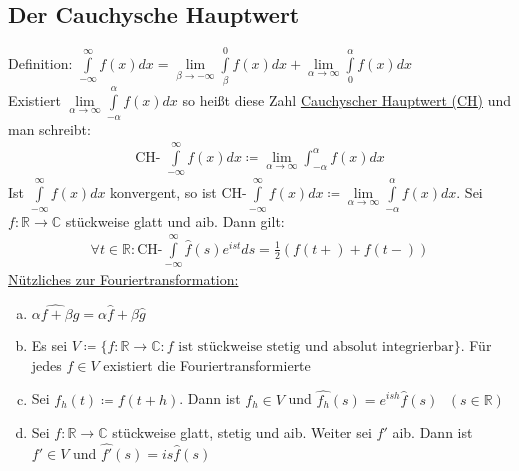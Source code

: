 \subsection{Der Cauchysche Hauptwert}
Definition: $ \int \limits_{-\infty}^\infty f(x) dx= \lim \limits_{\beta \to - \infty} \int \limits_\beta^0 f(x) dx + \lim \limits_{\alpha \to \infty} \int \limits_0^\alpha f(x) dx$ \\
Existiert $\lim \limits_{\alpha \to \infty} \int \limits_{-\alpha}^\alpha f(x) dx$ so heißt diese Zahl \underline{Cauchyscher Hauptwert (CH)} und man schreibt: 
\begin{align*}
    \text{CH- } \int \limits_{- \infty}^\infty f(x) dx \coloneqq \lim \limits_{\alpha \to \infty} \int_{-\alpha}^\alpha f(x) dx
\end{align*}
Ist $\int \limits_{-\infty}^{\infty} f(x) dx$ konvergent, so ist $\text{CH-} \int \limits_{-\infty}^\infty f(x) dx \coloneqq \lim \limits_{\alpha \to \infty} \int \limits_{-\alpha}^\alpha f(x) dx$.
Sei $f: \mathbb{R} \to \mathbb{C}$ stückweise glatt und aib. Dann gilt:
\begin{align*}
    \forall t \in \mathbb{R}: \text{CH-}\int \limits_{-\infty}^\infty \widehat{f}(s)e^{ist} ds = \frac{1}{2} (f(t+) + f(t-))
\end{align*}
\underline{Nützliches zur Fouriertransformation:}
\begin{enumerate} [a)]
    \item $\widehat{\alpha f + \beta g} = \alpha \widehat{f} + \beta \widehat{g}$
    \item Es sei $V \coloneqq \{ f: \mathbb{R} \to \mathbb{C}: f \text{ ist stückweise stetig und absolut integrierbar}\}$. Für jedes $f \in V$ existiert die Fouriertransformierte
    \item Sei $f_h(t) \coloneqq f(t+h)$. Dann ist $f_h \in V$ und $\widehat{f_h}(s) = e^{ish} \widehat{f}(s) \text{ } (s \in \mathbb{R})$
    \item Sei $f: \mathbb{R} \to \mathbb{C}$ stückweise glatt, stetig und aib. Weiter sei $f'$ aib. Dann ist $f' \in V$ und $\widehat{f'}(s) = is\widehat{f}(s)$
\end{enumerate}

